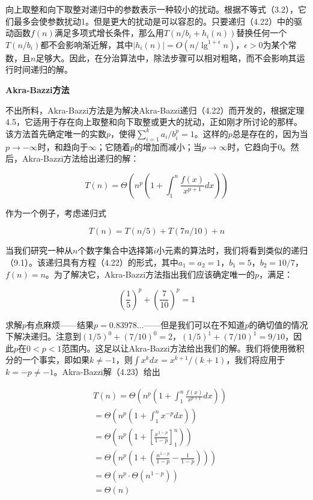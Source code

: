 \documentclass[lang=cn,newtx,10pt,scheme=chinese]{elegantbook}
\begin{document}
向上取整和向下取整对递归中的参数表示一种较小的扰动。根据不等式（3.2），它们最多会使参数扰动1。但是更大的扰动是可以容忍的。只要递归（4.22）中的驱动函数$f(n)$满足多项式增长条件，那么用$T\left(n / b_i+h_i(n)\right)$替换任何一个$T\left(n / b_i\right)$都不会影响渐近解，其中$\left|h_i(n)\right|=O\left(n / \lg ^{1+\epsilon} n\right)$，$\epsilon>0$为某个常数，且$n$足够大。因此，在分治算法中，除法步骤可以相对粗略，而不会影响其运行时间递归的解。

\textbf{Akra-Bazzi方法}

不出所料，Akra-Bazzi方法是为解决Akra-Bazzi递归（4.22）而开发的，根据定理4.5，它适用于存在向上取整和向下取整或更大的扰动，正如刚才所讨论的那样。该方法首先确定唯一的实数$p$，使得$\sum_{i=1}^k a_i / b_i^p=1$。这样的$p$总是存在的，因为当$p \rightarrow-\infty$时，和趋向于$\infty$；它随着$p$的增加而减小；当$p \rightarrow \infty$时，它趋向于0。然后，Akra-Bazzi方法给出递归的解：

\begin{equation}
T(n)=\Theta\left(n^p\left(1+\int_1^n \frac{f(x)}{x^{p+1}} d x\right)\right)
\end{equation}

作为一个例子，考虑递归式

\begin{equation}
T(n)=T(n / 5)+T(7 n / 10)+n
\end{equation}

当我们研究一种从$n$个数字集合中选择第$i$小元素的算法时，我们将看到类似的递归（9.1）。该递归具有方程（4.22）的形式，其中$a_1=a_2=1$，$b_1=5$，$b_2=10/7$，$f(n)=n$。为了解决它，Akra-Bazzi方法指出我们应该确定唯一的$p$，满足：

$$
\left(\frac{1}{5}\right)^p+\left(\frac{7}{10}\right)^p=1
$$

求解$p$有点麻烦——结果$p=0.83978 \ldots$——但是我们可以在不知道$p$的确切值的情况下解决递归。注意到$(1 / 5)^0+(7 / 10)^0=2$，$(1 / 5)^1+(7 / 10)^1=9 / 10$，因此$p$在$0<p<1$范围内。这足以让Akra-Bazzi方法给出我们的解。我们将使用微积分的一个事实，即如果$k \neq-1$，则$\int x^k d x=x^{k+1} /(k+1)$，我们将应用于$k=-p \neq-1$。Akra-Bazzi解（4.23）给出

$$
\begin{aligned}
& T(n)=\Theta\left(n^p\left(1+\int_1^n \frac{f(x)}{x^{p+1}} d x\right)\right) \\
& =\Theta\left(n^p\left(1+\int_1^n x^{-p} d x\right)\right) \\
& =\Theta\left(n^p\left(1+\left[\frac{x^{1-p}}{1-p}\right]_1^n\right)\right) \\
& =\Theta\left(n^p\left(1+\left(\frac{n^{1-p}}{1-p}-\frac{1}{1-p}\right)\right)\right) \\
& =\Theta\left(n^p \cdot \Theta\left(n^{1-p}\right)\right) \\
& =\Theta(n) \\
&
\end{aligned}
$$
\end{document}
